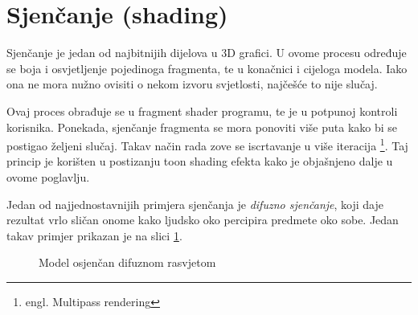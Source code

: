 \section{Sjenčanje (shading)}

Sjenčanje je jedan od najbitnijih dijelova u 3D grafici. U ovome procesu određuje se boja i osvjetljenje pojedinoga fragmenta, te u konačnici i cijeloga modela. Iako ona ne mora nužno ovisiti o nekom izvoru svjetlosti, najčešće to nije slučaj.

Ovaj proces obrađuje se u fragment shader programu, te je u potpunoj kontroli korisnika. Ponekada, sjenčanje fragmenta se mora ponoviti više puta kako bi se postigao željeni slučaj. Takav način rada zove se iscrtavanje u više iteracija \footnote{engl. Multipass rendering}. Taj princip je korišten u postizanju toon shading efekta kako je objašnjeno dalje u ovome poglavlju.

Jedan od najjednostavnijih primjera sjenčanja je \emph{difuzno sjenčanje}, koji daje rezultat vrlo sličan onome kako ljudsko oko percipira predmete oko sobe. Jedan takav primjer prikazan je na slici \ref{fig:monkey-plastic}.


\begin{figure}[H]
\centering{}
\caption{Model osjenčan difuznom rasvjetom}
\label{fig:monkey-plastic}
\end{figure}

